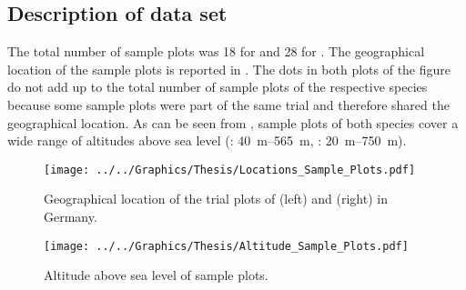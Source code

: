 \subsection{Description of data set}

The total number of sample plots was \num{18} for \beech{} and \num{28} for \spruce{}.  The geographical location of the sample plots is reported in .  The dots in both plots of the figure do not add up to the total number of sample plots of the respective species because some sample plots were part of the same trial and therefore shared the geographical location.  As can be seen from , sample plots of both species cover a wide range of altitudes above sea level (\beech{}: \SIrange{40}{565}{\meter}, \spruce{}: \SIrange{20}{750}{\meter}).

  
\begin{figure}[H]
  \centering
  \texttt{[image: ../../Graphics/Thesis/Locations\_Sample\_Plots.pdf]}
  \caption{Geographical location of the trial plots of \beech{} (left) and \spruce{} (right) in Germany.}
  \label{fig:Locations_Sample_Plots}
\end{figure}

\begin{figure}[H]
  \centering
  \texttt{[image: ../../Graphics/Thesis/Altitude\_Sample\_Plots.pdf]}
  \caption{Altitude above sea level of sample plots.}
  \label{fig:Altitude_Sample_Plots}
\end{figure}


